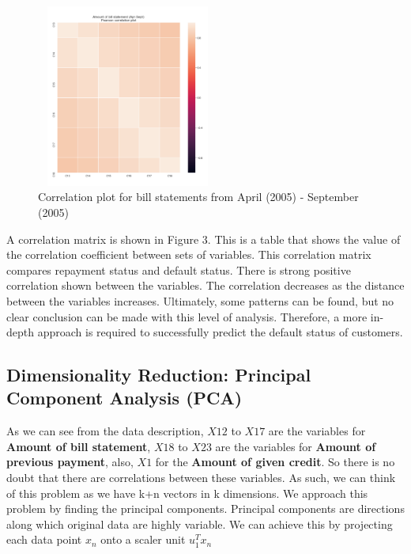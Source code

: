 \documentclass{article}
\begin{document}
\begin{figure}[h]
 \centering
 \includegraphics[width=6cm, height=6cm]{figure3.png}
 \caption{Correlation plot for bill statements from April (2005) - September (2005)}
 \label{fig:figure3}
\end{figure}
A correlation matrix is shown in Figure 3. This is a table that shows the value of the correlation coefficient between sets of variables. This correlation matrix compares repayment status and default status. There is strong positive correlation shown between the variables. The correlation decreases as the distance between the variables increases. Ultimately, some patterns can be found, but no clear conclusion can be made with this level of analysis. Therefore, a more in-depth approach is required to successfully predict the default status of customers. 

\subsection{Dimensionality Reduction: Principal Component Analysis (PCA)}
As we can see from the data description, $X12$ to $X17$ are the variables for \textbf{Amount of bill statement}, $X18$ to $X23$ are the variables for \textbf{Amount of previous payment}, also, $X1$ for the \textbf{Amount of given credit}. So there is no doubt that there are correlations between these variables. As such, we can think of this problem as we have k+n vectors in k dimensions. We approach this problem by finding the principal components. Principal components are directions along which original data are highly variable. We can achieve this by projecting each data point $x_n$ onto a scaler unit $u_{1}^{T}x_n$ 
\end{document}
